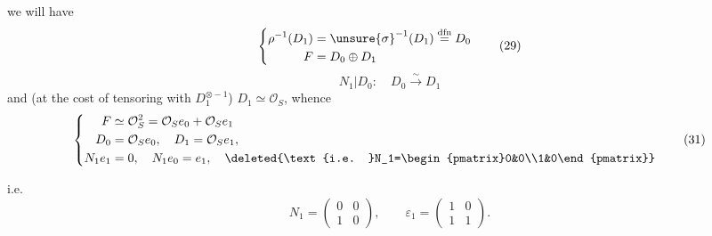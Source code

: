 we will have
\[
\left\{
\begin{aligned}
\rho^{-1}(D_1)&=\unsure{\sigma}^{-1}(D_1)\overset{\mathrm{dfn}}{=}D_0\\
F&=D_0\oplus D_1
\end{aligned}\right.
\tag{29}
\]
\[
N_1|D_0:\quad D_0\xrightarrow{\sim}D_1
\tag{30}
\]
and (at the cost of tensoring with $D_1^{\otimes-1}$) 
$D_1\simeq\mathcal O_S$, whence
\[
\left\{
\begin{aligned}
F&\simeq\mathcal O_S^2=\mathcal O_S e_0+\mathcal O_S e_1\\
D_0&=\mathcal O_S e_0,\quad D_1=\mathcal O_S e_1,\\
N_1e_1&=0,\quad N_1e_0=e_1,
\quad\deleted{\text{i.e. }N_1=\begin{pmatrix}0&0\\1&0\end{pmatrix}}
\end{aligned}\right.
\tag{31}
\]



i.e.
\[
N_1=\begin{pmatrix}0&0\\1&0\end{pmatrix},\qquad
\varepsilon_1=\begin{pmatrix}1&0\\1&1\end{pmatrix}.
\tag{32}
\]

